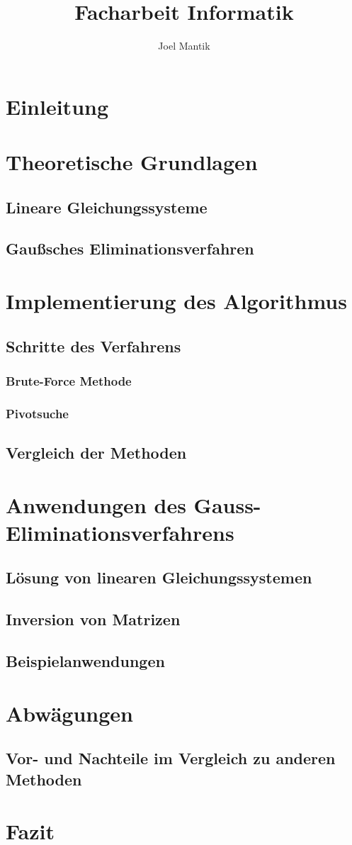 \documentclass[a4paper, 12pt]{report}
\title{Facharbeit Informatik}
\author{Joel Mantik}
\begin{document}
\maketitle
\tableofcontents

\chapter{Einleitung}
\chapter{Theoretische Grundlagen}
\section{Lineare Gleichungssysteme}
\section{Gaußsches Eliminationsverfahren}
\chapter{Implementierung des Algorithmus}
\section{Schritte des Verfahrens}
\subsection{Brute-Force Methode}
\subsection{Pivotsuche}
\section{Vergleich der Methoden}
\chapter{Anwendungen des Gauss-Eliminationsverfahrens}
\section{Lösung von linearen Gleichungssystemen}
\section{Inversion von Matrizen}
\section{Beispielanwendungen}
\chapter{Abwägungen}
\section{Vor- und Nachteile im Vergleich zu anderen Methoden}
\chapter{Fazit}
\end{document}
